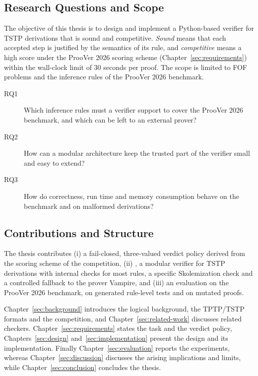 \subsection{Research Questions and Scope}
\label{subsec:rq}

The objective of this thesis is to design and implement a Python-based verifier for TSTP derivations that is sound and competitive.
\emph{Sound} means that each accepted step is justified by the semantics of its rule, and \emph{competitive} means a high score under the ProoVer 2026 scoring scheme (Chapter~\ref{sec:requirements}) within the wall-clock limit of 30 seconds per proof.
The scope is limited to FOF problems and the inference rules of the ProoVer 2026 benchmark.

\begin{description}
  \item[RQ1] Which inference rules must a verifier support to cover the ProoVer 2026 benchmark, and which can be left to an external prover?
  \item[RQ2] How can a modular architecture keep the trusted part of the verifier small and easy to extend?
  \item[RQ3] How do correctness, run time and memory consumption behave on the benchmark and on malformed derivations?
\end{description}

\subsection{Contributions and Structure}
\label{subsec:contributions}

The thesis contributes
(i) a fail-closed, three-valued verdict policy derived from the scoring scheme of the competition,
(ii) \TSTPy{}, a modular verifier for TSTP derivations with internal checks for most rules, a specific Skolemization check and a controlled fallback to the prover Vampire, and
(iii) an evaluation on the ProoVer 2026 benchmark, on generated rule-level tests and on mutated proofs.

Chapter~\ref{sec:background} introduces the logical background, the TPTP/TSTP formats and the competition, and Chapter~\ref{sec:related-work} discusses related checkers.
Chapter~\ref{sec:requirements} states the task and the verdict policy, Chapters~\ref{sec:design} and~\ref{sec:implementation} present the design and its implementation.
Finally Chapter~\ref{sec:evaluation} reports the experiments, whereas Chapter~\ref{sec:discussion} discusses the arising implications and limits, while Chapter~\ref{sec:conclusion} concludes the thesis.
